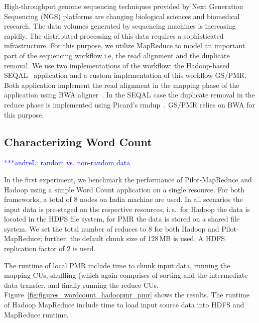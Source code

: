\documentclass{acm_proc_article-sp}
\newcommand{\alnote}[1]{ {\textcolor{blue} { ***andreL: #1 }}}
\newcommand{\alnote}[1]{}
\newcommand{\pilotmapreduce}{Pilot-MapReduce\xspace}
\begin{document}
High-throughput genome sequencing techniques provided by Next Generation
Sequencing (NGS) platforms are changing biological sciences and biomedical
research. The data volumes generated by sequencing machines is increasing
rapidly. The distributed processing of this data requires a sophisticated
infrastructure. For this purpose, we utilize MapReduce to model an important
part of the sequencing workflow i.e, the read alignment and the duplicate
removal. We use two implementations of the workflow: the Hadoop-based 
SEQAL~\cite{seal-2011} application and a custom implementation of this workflow 
GS/PMR. Both application implement the read alignment in the mapping phase of 
the application using BWA aligner~\cite{Li:2010:FAL:1741823.1741825}. In the 
SEQAL case the duplicate removal in the reduce phase is implemented using  
Picard's rmdup~\cite{picard}. GS/PMR relies on BWA for this purpose.




\subsection{Characterizing Word Count}
\alnote{random vs. non-random data}

In the first experiment, we benchmark the performance of \pilotmapreduce and
Hadoop using a simple Word Count application on a single resource. For both
frameworks, a total of 8 nodes on India machine are used. In all scenarios the
input data is pre-staged on the respective resources, i.\,e.\ for Hadoop the
data is located in the HDFS file system, for PMR the data is stored on a shared
file system. We set the total number of reduces to 8 for both Hadoop and
\pilotmapreduce; further, the default chunk size of 128\,MB is used. A HDFS
replication factor of 2 is used.

The runtime of local PMR include time to chunk input data, running the mapping
CUs, shuffling (which again comprises of sorting and the intermediate data
transfer, and finally running the reduce CUs.
Figure~\ref{fig:figures_wordcount_hadoopmr_pmr} shows the results. The runtime
of Hadoop MapReduce include time to load input source data into HDFS and
MapReduce runtime.
\end{document}
